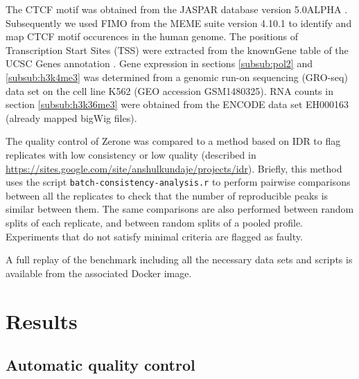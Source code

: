 \documentclass{bioinfo}
\begin{document}
\begin{methods}
The CTCF motif was obtained from the JASPAR database version
5.0{\textunderscore}ALPHA \citep[motif ID MA0139.1,][]{pmid24194598}.
Subsequently we used FIMO \citep{pmid21330290} from the MEME suite version
4.10.1 \citep{pmid19458158} to identify and map CTCF motif occurences in
the human genome. The positions of Transcription Start Sites (TSS)
were extracted from the knownGene
table of the UCSC Genes annotation \citep{Karolchik2004}.
Gene expression in sections \ref{subsub:pol2} and \ref{subsub:h3k4me3}
was determined from a genomic run-on sequencing (GRO-seq)
data set on the cell line K562 (GEO accession GSM1480325).
RNA counts in section \ref{subsub:h3k36me3} were obtained from the
ENCODE data set EH000163 (already mapped bigWig files).

The quality control of Zerone was compared to a method based on IDR
to flag replicates with low consistency or low quality
(described in \href{https://sites.google.com/site/anshulkundaje/projects/idr}{https://sites.google.com/site/anshulkundaje/projects/idr}).
Briefly, this method uses the script \texttt{batch-consistency-analysis.r}
to perform pairwise comparisons between all the
replicates to check that the number of reproducible peaks is
similar between them. The same comparisons are also performed between
random splits of each replicate, and between random splits of a
pooled profile. Experiments that do not satisfy minimal criteria
are flagged as faulty.

A full replay of the benchmark including all the necessary data sets
and scripts is available from the associated Docker image.

\end{methods}

\section{Results}
\label{sec:results}

\subsection{Automatic quality control}
\end{document}
